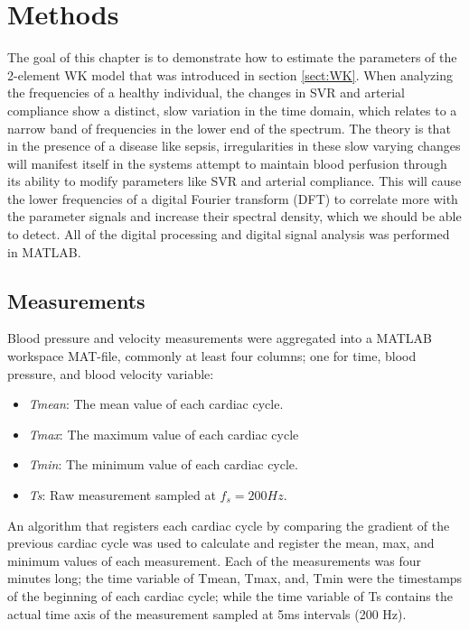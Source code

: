 
\chapter{Methods}

The goal of this chapter is to demonstrate how to estimate the parameters of the 2-element WK model that was introduced in section \ref{sect:WK}. When analyzing the frequencies of a healthy individual, the changes in SVR and arterial compliance show a distinct, slow variation in the time domain, which relates to a narrow band of frequencies in the lower end of the spectrum. The theory is that in the presence of a disease like sepsis, irregularities in these slow varying changes will manifest itself in the systems attempt to maintain blood perfusion through its ability to modify parameters like SVR and arterial compliance. This will cause the lower frequencies of a digital Fourier transform (DFT) to correlate more with the parameter signals and increase their spectral density, which we should be able to detect. All of the digital processing and digital signal analysis was performed in MATLAB.


\section{Measurements}\label{sect:measurements}
Blood pressure and velocity measurements were aggregated into a MATLAB workspace MAT-file, commonly at least four columns; one for time, blood pressure, and blood velocity variable:
\begin{itemize}
    \itemsep0em
    \item \textit{Tmean}: The mean value of each cardiac cycle.
    \item \textit{Tmax}: The maximum value of each cardiac cycle
    \item \textit{Tmin}: The minimum value of each cardiac cycle.
    \item \textit{Ts}: Raw measurement sampled at $f_s=200Hz$.
\end{itemize}
An algorithm that registers each cardiac cycle by comparing the gradient of the previous cardiac cycle was used to calculate and register the mean, max, and minimum values of each measurement. Each of the measurements was four minutes long; the time variable of Tmean, Tmax, and, Tmin were the timestamps of the beginning of each cardiac cycle; while the time variable of Ts contains the actual time axis of the measurement sampled at 5ms intervals (200 Hz).

